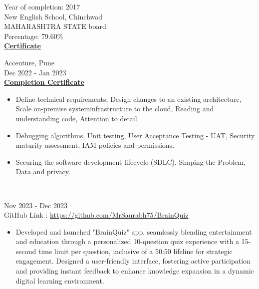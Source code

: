 \documentclass[letterpaper,10pt]{memoir} %
\begin{document}

{Year of completion: 2017}\\
{New English School, Chinchwad}\\
{MAHARASHTRA STATE board}\\
Percentage: 79.60\% \\
\textbf{\href{https://drive.google.com/file/d/1IxFursjJ43UGFS6yXX_HcLk-hw1T04D8/view}{Certificate}}\\



{Accenture, Pune}\\
{Dec 2022 - Jan 2023}\\
\textbf{\href{https://drive.google.com/file/d/1JDvsoCqJDaUUDvKgyLSU5DUn6cQJlzQp/view}{Completion Certificate}}
\begin{itemize}
	\item Define technical requirements, Design changes to an existing architecture, Scale on-premise systeminfrastructure to the cloud, Reading and understanding code, Attention to detail.

	\item Debugging algorithms, Unit testing, User Acceptance Testing - UAT, Security maturity assessment, IAM policies and permissions.

	\item Securing the software development lifecycle (SDLC), Shaping the Problem, Data and privacy.\\
\end{itemize}\\




{Nov 2023 - Dec 2023}\\
{GitHub Link : \href{https://github.com/MrSaurabh75/BrainQuiz}{https://github.com/MrSaurabh75/BrainQuiz}}
\begin{itemize}
    \item Developed and launched "BrainQuiz" app, seamlessly blending entertainment and education through a personalized 10-question quiz experience with a 15-second time limit per question, inclusive of a 50:50 lifeline for strategic engagement. Designed a user-friendly interface, fostering active participation and providing instant feedback to enhance knowledge expansion in a dynamic digital learning environment.
\end{itemize}
\clearpage %
\end{document}
